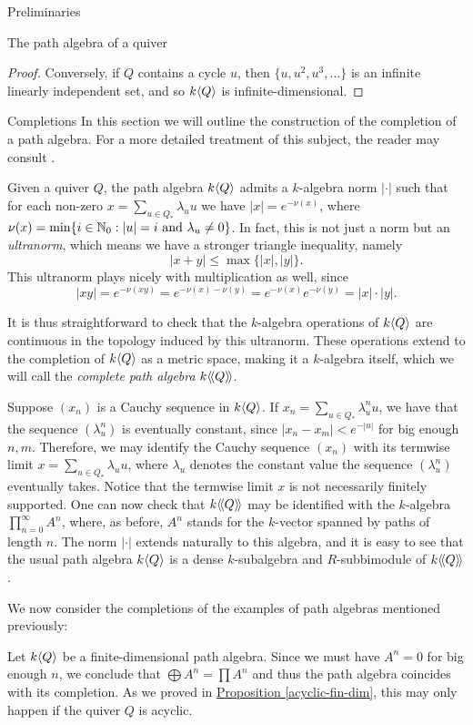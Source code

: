\begin{chapter}{Preliminaries}
\begin{section}{The path algebra of a quiver}
\begin{proof}
Conversely, if $Q$ contains a cycle $u$, then $\{u,u^2,u^3,\dots\}$ is an infinite linearly independent set, and so $k\langle Q\rangle$ is infinite-dimensional.
\end{proof}
\end{section}

\begin{section}{Completions}
In this section we will outline the construction of the completion of a path algebra. For a more detailed treatment of this subject, the reader may consult \cite{SAV15}.

Given a quiver $Q$, the path algebra $k\langle Q\rangle$ admits a $k$-algebra norm $\vert \cdot \vert$ such that for each non-zero $x=\sum_{u\in Q_*} \lambda_u u$ we have $\vert x\vert = e^{-\nu(x)}$, where $\nu(x) = \min\{ i\in \mathbb{N}_0 : |u| = i \text{ and } \lambda_u \neq 0 \}$. In fact, this is not just a norm but an \emph{ultranorm}, which means we have a stronger triangle inequality, namely \[|x+y|\leq \max\{|x|,|y|\}.\] This ultranorm plays nicely with multiplication as well, since \[|xy|=e^{-\nu(xy)}=e^{-\nu(x)-\nu(y)} = e^{-\nu(x)}e^{-\nu(y)}=|x|\cdot|y|.\]

It is thus straightforward to check that the $k$-algebra operations of $k\langle Q\rangle$ are continuous in the topology induced by this ultranorm. These operations extend to the completion of $k\langle Q\rangle$ as a metric space, making it a $k$-algebra itself, which we will call the \emph{complete path algebra} $k\langle\!\langle Q\rangle\!\rangle$.

Suppose $(x_n)$ is a Cauchy sequence in $k\langle Q\rangle$. If $x_n=\sum_{u\in Q_*} \lambda_u^n u$, we have that the sequence $(\lambda_u^n)$ is eventually constant, since $|x_n-x_m|<e^{-|u|}$ for big enough $n,m$. Therefore, we may identify the Cauchy sequence $(x_n)$ with its termwise limit $x=\sum_{u\in Q_*} \lambda_u u$, where $\lambda_u$ denotes the constant value the sequence $(\lambda_u^n)$ eventually takes. Notice that the termwise limit $x$ is not necessarily finitely supported. One can now check that $k\langle\!\langle Q\rangle\!\rangle$ may be identified with the $k$-algebra $\prod_{n=0}^\infty A^n$, where, as before, $A^n$ stands for the $k$-vector spanned by paths of length $n$. The norm $|\cdot|$ extends naturally to this algebra, and it is easy to see that the usual path algebra $k\langle Q\rangle$ is a dense $k$-subalgebra and $R$-subbimodule of $k\langle\!\langle Q\rangle\!\rangle$.

We now consider the completions of the examples of path algebras mentioned previously:

\begin{exmp}Let $k\langle Q\rangle$ be a finite-dimensional path algebra. Since we must have $A^n=0$ for big enough $n$, we conclude that $\bigoplus A^n=\prod A^n$ and thus the path algebra coincides with its completion. As we proved in \hyperref[acyclic-fin-dim]{Proposition \ref*{acyclic-fin-dim}}, this may only happen if the quiver $Q$ is acyclic.
\end{exmp}


\end{section}
\end{chapter}
